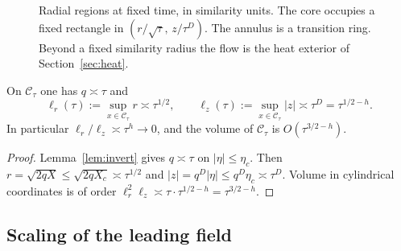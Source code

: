 \begin{figure}[t]
\centering
{}
\caption{Radial regions at fixed time, in similarity units. The core occupies a fixed rectangle in $(r/\sqrt{\tau},\,z/\tau^D)$. The annulus is a transition ring. Beyond a fixed similarity radius the flow is the heat exterior of Section~\ref{sec:heat}.}
\label{fig:regions}
\end{figure}

\begin{lemma}
\label{lem:core-geom}
On $\mathcal C_\tau$ one has $q\asymp\tau$ and
\begin{equation}
\label{eq:ell}
\ell_r(\tau):=\sup_{x\in\mathcal C_\tau} r \asymp \tau^{1/2},
\qquad
\ell_z(\tau):=\sup_{x\in\mathcal C_\tau}|z| \asymp \tau^{D}=\tau^{1/2-h}.
\end{equation}
In particular $\ell_r/\ell_z\asymp\tau^{h}\to 0$, and the volume of $\mathcal C_\tau$ is $O(\tau^{3/2-h})$.
\end{lemma}

\begin{proof}
Lemma~\ref{lem:invert} gives $q\asymp\tau$ on $|\eta|\le\eta_c$. Then $r=\sqrt{2qX}\le \sqrt{2q X_c}\asymp\tau^{1/2}$ and $|z|=q^D|\eta|\le q^D\eta_c\asymp\tau^D$. Volume in cylindrical coordinates is of order $\ell_r^2\ell_z\asymp \tau\cdot\tau^{1/2-h}=\tau^{3/2-h}$.
\end{proof}

\subsection{Scaling of the leading field}
\label{sec:scaling}

